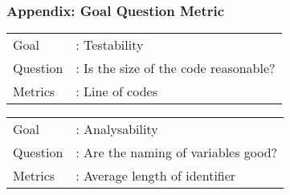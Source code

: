 \begin{frame}
\label{appendix:goal_question_metric}
\frametitle{Appendix: Goal Question Metric}

\begin{example}
\begin{tabular}{ l l }
Goal &: Testability \\
Question &: Is the size of the code reasonable? \\
Metrics &: Line of codes\\
\end{tabular}
\end{example}

\begin{example}
\begin{tabular}{ l l }
Goal &: Analysability \\
Question &: Are the naming of variables good? \\
Metrics &: Average length of identifier\\
\end{tabular}
\end{example}

\hyperlink{subsection:goal_question_metric}{}

\end{frame}